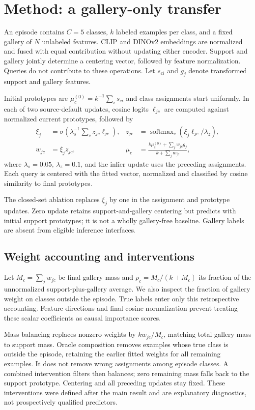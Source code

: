 \section{Method: a gallery-only transfer}
An episode contains $C=5$ classes, $k$ labeled examples per class, and a fixed gallery of $N$ unlabeled features. CLIP and DINOv2 embeddings \citep{clip,dinov2} are normalized and fused with equal contribution without updating either encoder. Support and gallery jointly determine a centering vector, followed by feature normalization. Queries do not contribute to these operations. Let $s_{ci}$ and $g_j$ denote transformed support and gallery features.

Initial prototypes are $\mu_c^{(0)}=k^{-1}\sum_i s_{ci}$ and class assignments start uniformly. In each of two source-default updates, cosine logits $\ell_{jc}$ are computed against normalized current prototypes, followed by
\begin{align}
 \xi_j &= \sigma\!\left(\lambda_s^{-1}\sum_c z_{jc}\ell_{jc}\right),&
 z_{jc} &= \operatorname{softmax}_c(\xi_j\ell_{jc}/\lambda_z),\\
 w_{jc} &= \xi_j z_{jc},&
 \mu_c &= \frac{k\mu_c^{(0)}+\sum_jw_{jc}g_j}{k+\sum_jw_{jc}},
\end{align}
where $\lambda_s=0.05$, $\lambda_z=0.1$, and the inlier update uses the preceding assignments. Each query is centered with the fitted vector, normalized and classified by cosine similarity to final prototypes.

The closed-set ablation replaces $\xi_j$ by one in the assignment and prototype updates. Zero update retains support-and-gallery centering but predicts with initial support prototypes; it is not a wholly gallery-free baseline. Gallery labels are absent from eligible inference interfaces.

\subsection{Weight accounting and interventions}
Let $M_c=\sum_jw_{jc}$ be final gallery mass and $\rho_c=M_c/(k+M_c)$ its fraction of the unnormalized support-plus-gallery average. We also inspect the fraction of gallery weight on classes outside the episode. True labels enter only this retrospective accounting. Feature directions and final cosine normalization prevent treating these scalar coefficients as causal importance scores.

Mass balancing replaces nonzero weights by $kw_{jc}/M_c$, matching total gallery mass to support mass. Oracle composition removes examples whose true class is outside the episode, retaining the earlier fitted weights for all remaining examples. It does not remove wrong assignments among episode classes. A combined intervention filters then balances; zero remaining mass falls back to the support prototype. Centering and all preceding updates stay fixed. These interventions were defined after the main result and are explanatory diagnostics, not prospectively qualified predictors.
